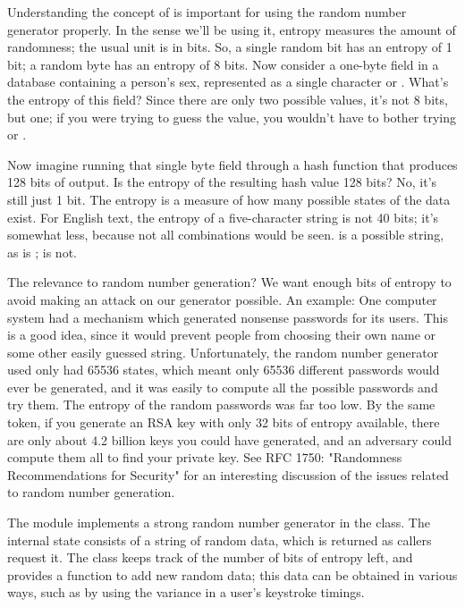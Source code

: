 \documentclass{howto}
\begin{document}
Understanding the concept of  is important for using the
random number generator properly.  In the sense we'll be using it,
entropy measures the amount of randomness; the usual unit is in bits.
So, a single random bit has an entropy of 1 bit; a random byte has an
entropy of 8 bits.  Now consider a one-byte field in a database containing a
person's sex, represented as a single character  or .
What's the entropy of this field?  Since there are only two possible
values, it's not 8 bits, but one; if you were trying to guess the value,
you wouldn't have to bother trying  or .  

Now imagine running that single byte field through a hash function that
produces 128 bits of output.  Is the entropy of the resulting hash value
128 bits?  No, it's still just 1 bit.  The entropy is a measure of how many
possible states of the data exist.  For English
text, the entropy of a five-character string is not 40 bits; it's
somewhat less, because not all combinations would be seen.  
is a possible string, as is ;  is not.

The relevance to random number generation?  We want enough bits of
entropy to avoid making an attack on our generator possible.  An
example: One computer system had a mechanism which generated nonsense
passwords for its users.  This is a good idea, since it would prevent
people from choosing their own name or some other easily guessed string.
Unfortunately, the random number generator used only had 65536 states,
which meant only 65536 different passwords would ever be generated, and
it was easily to compute all the possible passwords and try them.  The
entropy of the random passwords was far too low.  By the same token, if
you generate an RSA key with only 32 bits of entropy available, there
are only about 4.2 billion keys you could have generated, and an
adversary could compute them all to find your private key.  See RFC 1750:
"Randomness Recommendations for Security" for an interesting discussion
of the issues related to random number generation.

The  module implements a strong random number generator
in the  class.  The internal state consists of a string
of random data, which is returned as callers request it.  The class
keeps track of the number of bits of entropy left, and provides a function to
add new random data; this data can be obtained in various ways, such as
by using the variance in a user's keystroke timings.  
\end{document}
